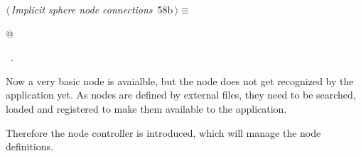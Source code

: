 \documentclass[
    a4paper,      %
    10pt,         %
    openright,    %
    notitlepage,  %
    parskip=half, %
]{scrreprt}       %
\theoremstyle{definition}                    %
\begin{document}
\begin{flushleft} \small
\begin{minipage}{\linewidth}\label{scrap96}\raggedright\small
{} $\langle\,${\itshape Implicit sphere node connections}\nobreak\ {\footnotesize {58b}}$\,\rangle\equiv$
\vspace{-1exm}
\begin{list}{}{} \item
\mbox{}@{\NWsep}
\end{list}
\vspace{-1.5ex}
\footnotesize
\begin{list}{}{\setlength{\itemsep}{-\parsep}\setlength{\itemindent}{-\leftmargin}}
\item \NWtxtMacroRefIn\ .

\item{}
\end{list}
\end{minipage}\vspace{4ex}
\end{flushleft}
Now a very basic node is avaialble, but the node does not get recognized by the
application yet. As nodes are defined by external files, they need to be
searched, loaded and registered to make them available to the application.

Therefore the node controller is introduced, which will manage the node
definitions.
\end{document}
